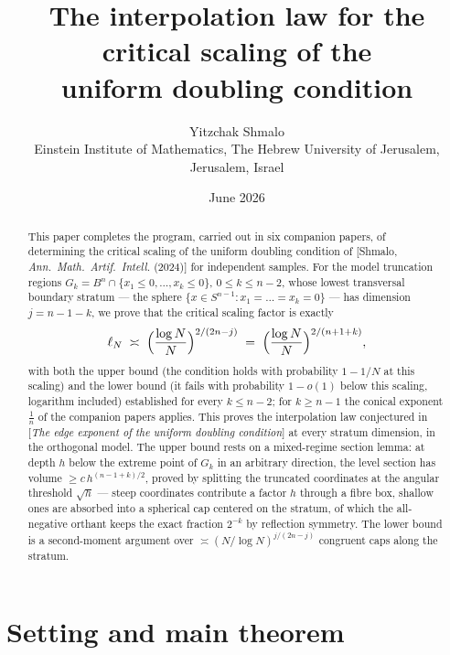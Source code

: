﻿\documentclass[11pt]{article}
\title{The interpolation law for the critical scaling of the\\
uniform doubling condition}
\author{Yitzchak Shmalo\\
\small Einstein Institute of Mathematics, The Hebrew University of Jerusalem, Jerusalem, Israel\\
\small }
\date{June 2026}
\begin{document}
\maketitle

\begin{abstract}
This paper completes the program, carried out in six companion papers, of
determining the critical scaling of the uniform doubling condition of
[Shmalo, \emph{Ann.\ Math.\ Artif.\ Intell.} (2024)] for independent samples.
For the model truncation regions
$G_k=B^n\cap\{x_1\le0,\dots,x_k\le0\}$, $0\le k\le n-2$, whose lowest
transversal boundary stratum --- the sphere
$\{x\in S^{n-1}:x_1=\dots=x_k=0\}$ --- has dimension $j=n-1-k$, we prove that
the critical scaling factor is exactly
\[
\ell_N\;\asymp\;\Bigl(\frac{\log N}{N}\Bigr)^{2/(2n-j)}
\;=\;\Bigl(\frac{\log N}{N}\Bigr)^{2/(n+1+k)},
\]
with both the upper bound (the condition holds with probability $1-1/N$ at
this scaling) and the lower bound (it fails with probability $1-o(1)$ below
this scaling, logarithm included) established for every $k\le n-2$; for
$k\ge n-1$ the conical exponent $\frac1n$ of the companion papers applies.
This proves the interpolation law conjectured in
[\emph{The edge exponent of the uniform doubling condition}] at every stratum
dimension, in the orthogonal model.  The upper bound rests on a mixed-regime
section lemma: at depth $h$ below the extreme point of $G_k$ in an arbitrary
direction, the level section has volume $\ge c\,h^{(n-1+k)/2}$, proved by
splitting the truncated coordinates at the angular threshold
$\sqrt h$ --- steep coordinates contribute a factor $h$ through a fibre box,
shallow ones are absorbed into a spherical cap centered on the stratum, of
which the all-negative orthant keeps the exact fraction $2^{-k}$ by reflection
symmetry.  The lower bound is a second-moment argument over
$\asymp(N/\log N)^{j/(2n-j)}$ congruent caps along the stratum.
\end{abstract}

\section{Setting and main theorem}\label{sec:intro}
\end{document}
